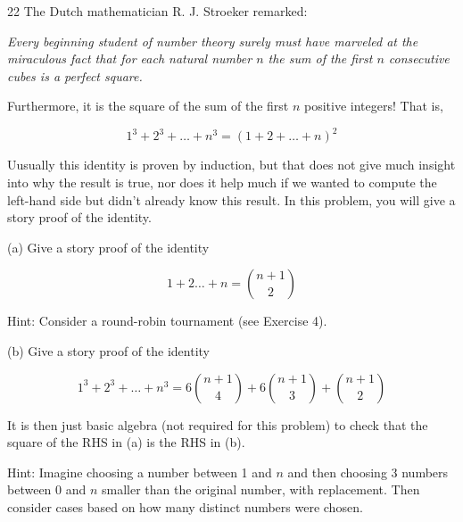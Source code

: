 \begin{exercise}{22}
    The Dutch mathematician R. J. Stroeker remarked:
    
    \textit{
        Every beginning student of number theory surely must have marveled at the miraculous fact that for each natural number $n$ the sum of the first $n$ consecutive cubes is a perfect square.}
    
        Furthermore, it is the square of the sum of the first $n$ positive integers! That is,

        \[1^3 + 2^3 + \ldots + n^3 = (1 + 2 + \ldots + n)^2\]

        Uusually this identity is proven by induction, but that does not give much insight into why the result is true, nor does it help much if we wanted to compute the left-hand side but didn't already know this result.
        In this problem, you will give a story proof of the identity.

        (a) Give a story proof of the identity

        \[1 + 2 \ldots + n = \binom{n + 1}{2}\]

        Hint: Consider a round-robin tournament (see Exercise 4).

        (b) Give a story proof of the identity

        \[1^3 + 2^3 + \ldots + n^3 = 6\binom{n + 1}{4} + 6\binom{n + 1}{3} + \binom{n + 1}{2}\]

        It is then just basic algebra (not required for this problem) to check that the square of the RHS in (a) is the RHS in (b).

        Hint: Imagine choosing a number between 1 and $n$ and then choosing 3 numbers between 0 and $n$ smaller than the original number, with replacement.
        Then consider cases based on how many distinct numbers were chosen.
\end{exercise}

